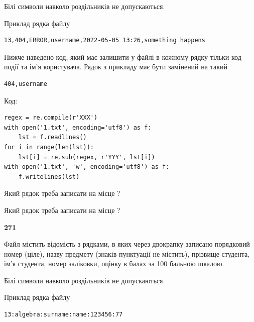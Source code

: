 Білі символи навколо роздільників не допускаються.

Приклад рядка файлу



\begin{verbatim}
13,404,ERROR,username,2022-05-05 13:26,something happens
\end{verbatim}


Нижче наведено код, який має залишити у файлі в кожному рядку тільки код події та ім'я користувача. Рядок з прикладу має бути замінений на такий



\begin{verbatim}
404,username
\end{verbatim}




Код:



\begin{verbatim}
regex = re.compile(r'XXX')
with open('1.txt', encoding='utf8') as f:
    lst = f.readlines()
for i in range(len(lst)):
    lst[i] = re.sub(regex, r'YYY', lst[i])
with open('1.txt', 'w', encoding='utf8') as f:
    f.writelines(lst)
\end{verbatim}







Який рядок треба записати на місце  ?\par
\vspace{5mm}


Який рядок треба записати на місце  ?\par


\newpage

{\begin {center}\textbf{ 271}\end {center}}\par
Файл  містить відомість з рядками, в яких через двокрапку записано поряд\-ковий номер (ціле), назву предмету (знаків пунктуації не містить), прізвище студента, ім'я студента, номер заліковки, оцінку в балах за 100 бальною шкалою.

Білі символи навколо роздільників не допускаються.

Приклад рядка файлу



\begin{verbatim}
13:algebra:surname:name:123456:77
\end{verbatim}


